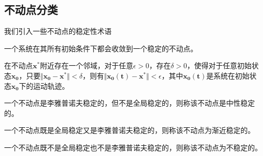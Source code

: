 \subsection{不动点分类}
我们引入一些不动点的稳定性术语
\begin{defn}

    一个系统在其所有初始条件下都会收敛到一个稳定的不动点。
\end{defn}
\begin{defn}

    在不动点$\mathbf{x^*}$附近存在一个邻域，对于任意$\epsilon>0$，存在$\delta>0$，使得对于任意初始状态$\mathbf{x_0}$，只要$\Vert \mathbf{x_0}-\mathbf{x^*}\Vert<\delta$，则有$\Vert \mathbf{x_0(t)}-\mathbf{x^*}\Vert<\epsilon$，其中$\mathbf{x_0(t)}$是系统在初始状态$\mathbf{x_0}$下的运动轨迹。
\end{defn}
\begin{defn}

    一个不动点是李雅普诺夫稳定的，但不是全局稳定的，则称该不动点是中性稳定的。
\end{defn}
\begin{defn}

    一个不动点既是全局稳定又是李雅普诺夫稳定的，则称该不动点为渐近稳定的。
\end{defn}
\begin{defn}

    一个不动点既不是全局稳定也不是李雅普诺夫稳定的，则称该不动点为不稳定的。
\end{defn}

